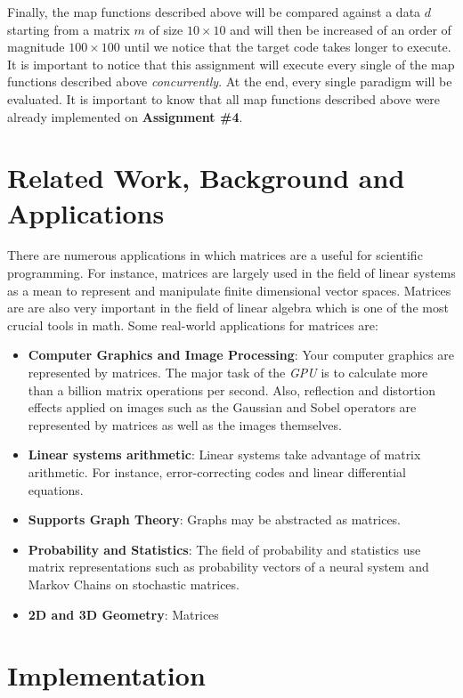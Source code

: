 \documentclass[conference]{IEEEtran}
\begin{document}
Finally, the map functions described above will be compared against a data $d$ starting from a matrix $m$ of size $10\times10$ and will then be increased of an order of magnitude $100\times100$ until we notice that the target code takes longer to execute. It is important to notice that this assignment will execute every single of the map functions described above \textit{concurrently}. At the end, every single paradigm will be evaluated. It is important to know that all map functions described above were already implemented on \textbf{Assignment \#4}.

\section{Related Work, Background and Applications}
There are numerous applications in which matrices are a useful for scientific programming. For instance, matrices are largely used in the field of linear systems as a mean to represent and manipulate finite dimensional vector spaces. Matrices are are also very important in the field of linear algebra which is one of the most crucial tools in math. Some real-world applications for matrices are:  

\begin{itemize}
	\item \textbf{Computer Graphics and Image Processing}: Your computer graphics are represented by matrices. The major task of the \textit{GPU} is to calculate more than a billion matrix operations per second. Also, reflection and distortion effects applied on images such as the Gaussian and Sobel operators are represented by matrices as well as the images themselves.
	\item \textbf{Linear systems arithmetic}: Linear systems take advantage of matrix arithmetic. For instance, error-correcting codes and linear differential equations.
	\item \textbf{Supports Graph Theory}: Graphs may be abstracted as matrices.
	\item \textbf{Probability and Statistics}: The field of probability and statistics use matrix representations such as probability vectors of a neural system and Markov Chains on stochastic matrices.
	\item \textbf{2D and 3D Geometry}: Matrices 
\end{itemize}

\section{Implementation}
\end{document}

